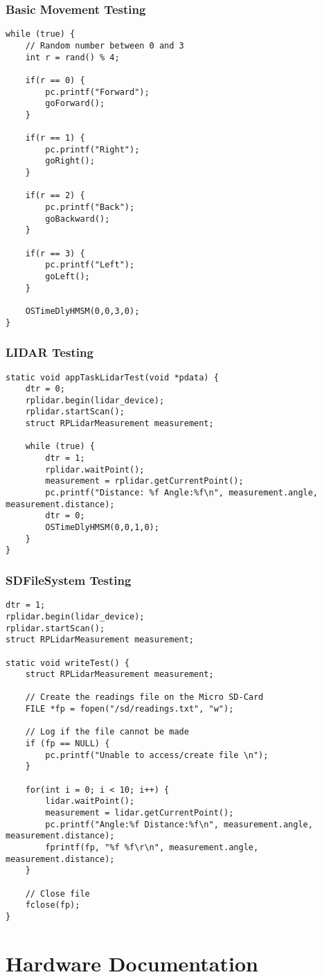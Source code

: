 \begin{appendices}
			\subsection{Basic Movement Testing}
			\label{testcode:movementbasic}
			\begin{lstlisting}
while (true) {
	// Random number between 0 and 3
	int r = rand() % 4;
					
	if(r == 0) {
		pc.printf("Forward");
		goForward();
	}
					
	if(r == 1) {
		pc.printf("Right");
		goRight();
	}
					
	if(r == 2) {
		pc.printf("Back");
		goBackward();
	}
					
	if(r == 3) {
		pc.printf("Left");
		goLeft();
	}

	OSTimeDlyHMSM(0,0,3,0);
}
			\end{lstlisting}
			
			\subsection{LIDAR Testing}
			\label{testcode:observation1}
			\begin{lstlisting}
static void appTaskLidarTest(void *pdata) {
	dtr = 0;
	rplidar.begin(lidar_device);
	rplidar.startScan();
	struct RPLidarMeasurement measurement;
				
	while (true) {
		dtr = 1;
		rplidar.waitPoint();
		measurement = rplidar.getCurrentPoint();
		pc.printf("Distance: %f Angle:%f\n", measurement.angle, measurement.distance);
		dtr = 0;
		OSTimeDlyHMSM(0,0,1,0);
	}
}
			\end{lstlisting}
			
			\subsection{SDFileSystem Testing}
			\label{testcode:filewriting2}
			\begin{lstlisting}
dtr = 1;
rplidar.begin(lidar_device);
rplidar.startScan();
struct RPLidarMeasurement measurement;
				
static void writeTest() {
	struct RPLidarMeasurement measurement;

	// Create the readings file on the Micro SD-Card
	FILE *fp = fopen("/sd/readings.txt", "w");
					
	// Log if the file cannot be made
	if (fp == NULL) {
		pc.printf("Unable to access/create file \n");
	}

	for(int i = 0; i < 10; i++) {
		lidar.waitPoint();
		measurement = lidar.getCurrentPoint();
		pc.printf("Angle:%f Distance:%f\n", measurement.angle, measurement.distance);
		fprintf(fp, "%f %f\r\n", measurement.angle, measurement.distance);
	}
					
	// Close file
	fclose(fp);
}
			\end{lstlisting}
	
	\chapter{Hardware Documentation}
	
	\end{appendices}
			
